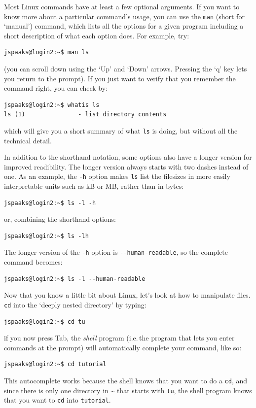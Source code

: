 Most Linux commands have at least a few optional arguments. If you want to know more about a particular command's usage, you can use the \texttt{man} (short for `manual') command, which lists all the options for a given program including a short description of what each option does. For example, try:
\begin{lstlisting}[style=basic,style=bash]
jspaaks@login2:~$ man ls
\end{lstlisting}
(you can scroll down using the `Up' and `Down' arrows. Pressing the `q' key lets you return to the prompt). If you just want to verify that you remember the command right, you can check by:
\begin{lstlisting}[style=basic,style=bash]
jspaaks@login2:~$ whatis ls
ls (1)               - list directory contents
\end{lstlisting}
which will give you a short summary of what \lstinline{ls} is doing, but without all the technical detail.

In addition to the shorthand notation, some options also have a longer version for improved readibility. The longer version always starts with two dashes instead of one. As an example, the \lstinline[style=bashinline]{-h} option makes \lstinline[style=bashinline]{ls} list the filesizes in more easily interpretable units such as kB or MB, rather than in bytes:
\begin{lstlisting}[style=basic,style=bash]
jspaaks@login2:~$ ls -l -h
\end{lstlisting}
or, combining the shorthand options:
\begin{lstlisting}[style=basic,style=bash]
jspaaks@login2:~$ ls -lh
\end{lstlisting}
The longer version of the \lstinline[style=bashinline]{-h} option is \lstinline[style=bashinline]{--human-readable}, so the complete command becomes:
\begin{lstlisting}[style=basic,style=bash]
jspaaks@login2:~$ ls -l --human-readable
\end{lstlisting}


Now that you know a little bit about Linux, let's look at how to manipulate files. \lstinline[style=bashinline]{cd} into the `deeply nested directory' by typing:
\begin{lstlisting}[style=basic,style=bash]
jspaaks@login2:~$ cd tu
\end{lstlisting}
if you now press Tab, the \textit{shell} program (i.e.\,the program that lets you enter commands at the prompt) will automatically complete your command, like so:
\begin{lstlisting}[style=basic,style=bash]
jspaaks@login2:~$ cd tutorial
\end{lstlisting}
This autocomplete works because the shell knows that you want to do a \lstinline[style=bashinline]{cd}, and since there is only one directory in \textasciitilde{} that starts with \lstinline[style=bashinline]{tu}, the shell program knows that you want to \lstinline[style=bashinline]{cd} into \lstinline[style=bashinline]{tutorial}.

